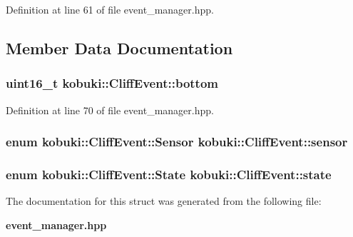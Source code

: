 \-Definition at line 61 of file event\-\_\-manager.\-hpp.



\subsection{\-Member \-Data \-Documentation}
\subsubsection[{bottom}]{\setlength{\rightskip}{0pt plus 5cm}uint16\-\_\-t {\bf kobuki\-::\-Cliff\-Event\-::bottom}}\label{structkobuki_1_1CliffEvent_ae837b247e5ee75496c5d37a3dee33601}


\-Definition at line 70 of file event\-\_\-manager.\-hpp.

\subsubsection[{sensor}]{\setlength{\rightskip}{0pt plus 5cm}enum {\bf kobuki\-::\-Cliff\-Event\-::\-Sensor}  {\bf kobuki\-::\-Cliff\-Event\-::sensor}}\label{structkobuki_1_1CliffEvent_a3e3bbbcc1b8841e4b140f459e9ad2708}
\subsubsection[{state}]{\setlength{\rightskip}{0pt plus 5cm}enum {\bf kobuki\-::\-Cliff\-Event\-::\-State}  {\bf kobuki\-::\-Cliff\-Event\-::state}}\label{structkobuki_1_1CliffEvent_af702c693bc99a63e5c7f61ed17bd2497}


\-The documentation for this struct was generated from the following file\-:\begin{DoxyCompactItemize}
\item 
{\bf event\-\_\-manager.\-hpp}\end{DoxyCompactItemize}
